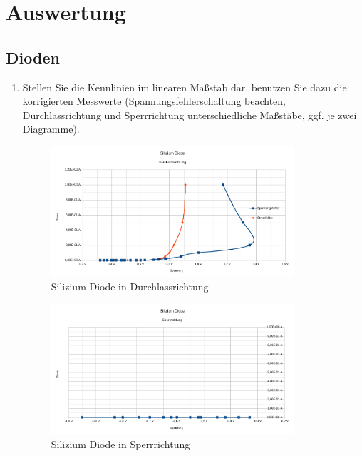 \section{Auswertung}
\subsection{Dioden}
\begin{enumerate}[label=\alph*)]
	\item Stellen Sie die Kennlinien im linearen Maßstab dar, benutzen Sie dazu die korrigierten Messwerte (Spannungsfehlerschaltung beachten, Durchlassrichtung und Sperrrichtung unterschiedliche Maßstäbe, ggf. je zwei Diagramme).
	      \begin{figure}[h!]
		      \begin{center}
			      \includegraphics[width=0.85\textwidth]{img/4.1.a.1}
			      \caption{Silizium Diode in Durchlassrichtung}
		      \end{center}
	      \end{figure}

	      \begin{figure}[h!]
		      \begin{center}
			      \includegraphics[width=0.85\textwidth]{img/4.1.a.2}
			      \caption{Silizium Diode in Sperrrichtung}
		      \end{center}
	      \end{figure}


\end{enumerate}

